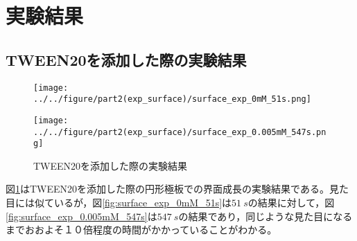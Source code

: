 \documentclass[autodetect-engine,dvi=dvipdfmx,a4paper,ja=standard,oneside,openany,11pt,draft]{bxjsbook}
\begin{document}
\section{実験結果}
\subsection{TWEEN20を添加した際の実験結果}
\begin{figure}[H]
  \begin{minipage}
    {0.5\textwidth}
    \centering
    \texttt{[image: ../../figure/part2(exp\_surface)/surface\_exp\_0mM\_51s.png]}
    \label{fig:surface_exp_0mM_51s}
  \end{minipage}
  \begin{minipage}
    {0.5\textwidth}
    \centering
    \texttt{[image: ../../figure/part2(exp\_surface)/surface\_exp\_0.005mM\_547s.png]}
    \label{fig:surface_exp_0.005mM_547s}
  \end{minipage}
  \caption{TWEEN20を添加した際の実験結果}
  \label{fig:surface_exp}
\end{figure}
図\ref{fig:surface_exp}はTWEEN20を添加した際の円形極板での界面成長の実験結果である。見た目には似ているが，図\ref{fig:surface_exp_0mM_51s}は$\SI{51}{s}$の結果に対して，図\ref{fig:surface_exp_0.005mM_547s}は$\SI{547}{s}$の結果であり，同じような見た目になるまでおおよそ１０倍程度の時間がかかっていることがわかる。
\end{document}
